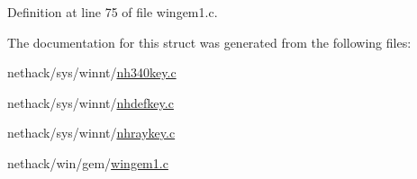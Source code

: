 Definition at line 75 of file wingem1.\+c.



The documentation for this struct was generated from the following files\+:\begin{DoxyCompactItemize}
\item 
nethack/sys/winnt/\hyperlink{nh340key_8c}{nh340key.\+c}\item 
nethack/sys/winnt/\hyperlink{nhdefkey_8c}{nhdefkey.\+c}\item 
nethack/sys/winnt/\hyperlink{nhraykey_8c}{nhraykey.\+c}\item 
nethack/win/gem/\hyperlink{wingem1_8c}{wingem1.\+c}\end{DoxyCompactItemize}
